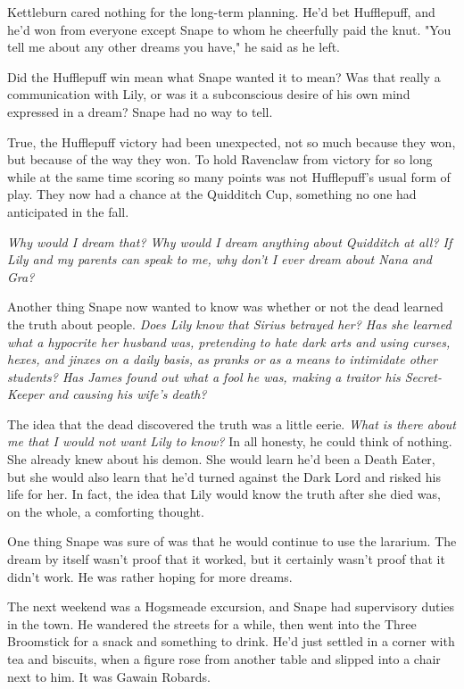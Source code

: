 Kettleburn cared nothing for the long-term planning. He'd bet Hufflepuff, and he'd won from everyone except Snape to whom he cheerfully paid the knut. "You tell me about any other dreams you have," he said as he left.

Did the Hufflepuff win mean what Snape wanted it to mean? Was that really a communication with Lily, or was it a subconscious desire of his own mind expressed in a dream? Snape had no way to tell.

True, the Hufflepuff victory had been unexpected, not so much because they won, but because of the way they won. To hold Ravenclaw from victory for so long while at the same time scoring so many points was not Hufflepuff's usual form of play. They now had a chance at the Quidditch Cup, something no one had anticipated in the fall.

\emph{Why would I dream that? Why would I dream anything about Quidditch at all? If Lily and my parents can speak to me, why don't I ever dream about Nana and Gra?}

Another thing Snape now wanted to know was whether or not the dead learned the truth about people. \emph{Does Lily know that Sirius betrayed her? Has she learned what a hypocrite her husband was, pretending to hate dark arts and using curses, hexes, and jinxes on a daily basis, as pranks or as a means to intimidate other students? Has James found out what a fool he was, making a traitor his Secret-Keeper and causing his wife's death?}

The idea that the dead discovered the truth was a little eerie. \emph{What is there about me that I would not want Lily to know?} In all honesty, he could think of nothing. She already knew about his demon. She would learn he'd been a Death Eater, but she would also learn that he'd turned against the Dark Lord and risked his life for her. In fact, the idea that Lily would know the truth after she died was, on the whole, a comforting thought.

One thing Snape was sure of was that he would continue to use the lararium. The dream by itself wasn't proof that it worked, but it certainly wasn't proof that it didn't work. He was rather hoping for more dreams.

The next weekend was a Hogsmeade excursion, and Snape had supervisory duties in the town. He wandered the streets for a while, then went into the Three Broomstick for a snack and something to drink. He'd just settled in a corner with tea and biscuits, when a figure rose from another table and slipped into a chair next to him. It was Gawain Robards.

